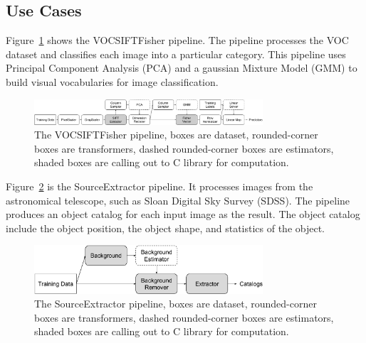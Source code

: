 \documentclass{sig-alternate}
\begin{document}
\subsection{Use Cases}
Figure~\ref{fig:vocsiftfisher} shows the VOCSIFTFisher pipeline. The pipeline processes the VOC dataset and classifies each image into a particular category.
This pipeline uses Principal Component Analysis (PCA) and a gaussian Mixture Model (GMM) to build visual vocabularies for image classification.
\begin{figure}[ht]
\begin{center}
    \includegraphics[width=85mm]{pictures/VOCSIFTFisher}
    \caption {The VOCSIFTFisher pipeline, boxes are dataset, rounded-corner boxes are transformers, dashed rounded-corner boxes are estimators, shaded boxes are calling out to C library for computation.
    \label{fig:vocsiftfisher}
}
\end{center}
\end{figure}

Figure~\ref{fig:sourceextractor} is the SourceExtractor pipeline. 
It processes images from the astronomical telescope, such as Sloan Digital Sky Survey (SDSS).
The pipeline produces an object catalog for each input image as the result. 
The object catalog include the object position, the object shape, and statistics of the object.

\begin{figure}[h]
\begin{center}
    \includegraphics[width=85mm]{pictures/SourceExtractor}
    \caption {The SourceExtractor pipeline, boxes are dataset, rounded-corner boxes are transformers, dashed rounded-corner boxes are estimators, shaded boxes are calling out to C library for computation.
    \label{fig:sourceextractor}
}
\end{center}
\end{figure}
\end{document}
